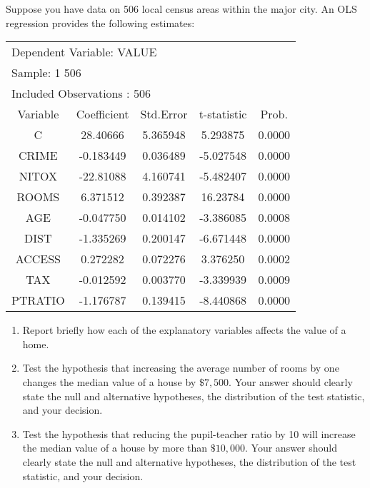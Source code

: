 \documentclass[12pt,a4paper]{article}
\begin{document}
\noindent Suppose you have data on 506 local census areas within the major city. An OLS regression provides the following estimates:
\begin{center}
\begin{tabular}{c c c c c}\\
\multicolumn{5}{l}{Dependent Variable: VALUE}\\
\multicolumn{5}{l}{Sample: 1 506}\\
\multicolumn{5}{l}{Included Observations : 506}\\ \hline

Variable & Coefficient & Std.Error & t-statistic & Prob. \\ \hline

C & 28.40666 & 5.365948 & 5.293875 & 0.0000 \\

CRIME & -0.183449 & 0.036489 & -5.027548 & 0.0000 \\

NITOX & -22.81088 & 4.160741 & -5.482407 & 0.0000 \\

ROOMS & 6.371512 & 0.392387 & 16.23784 & 0.0000 \\

AGE & -0.047750 & 0.014102 & -3.386085 & 0.0008 \\

DIST & -1.335269 & 0.200147 & -6.671448 & 0.0000 \\

ACCESS & 0.272282 & 0.072276 & 3.376250 & 0.0002 \\

TAX & -0.012592 & 0.003770 & -3.339939 & 0.0009 \\

PTRATIO & -1.176787 & 0.139415 & -8.440868 & 0.0000 \\ \hline
\end{tabular}
\end{center}
\begin{enumerate}
\item Report briefly how each of the explanatory variables affects
the value of a home. \vspace{0.1in}

\item Test the hypothesis that increasing the average number of rooms by one
changes the median value of a house by $\$7,500$. Your answer should
clearly state the null and alternative hypotheses, the distribution
of the test statistic, and your decision.

\item Test the hypothesis that reducing the
pupil-teacher ratio by 10 will increase the median value of a house by more
than $\$10,000$. Your answer should clearly state the null and
alternative hypotheses, the distribution of the test statistic, and
your decision.
\end{enumerate}
\end{document}
